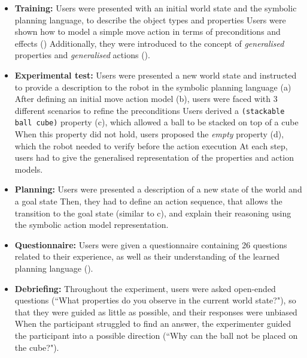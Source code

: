 \begin{itemize}
  \item{\textbf{Training:} Users were presented with an initial world state and the symbolic planning language, to describe the object types and properties
Users were shown how to model a simple move action in terms of preconditions and effects ()
Additionally, they were introduced to the concept of \textit{generalised} properties and \textit{generalised} actions ().}
  \item{\textbf{Experimental test:} Users were presented a new world state and instructed to provide a description to the robot in the symbolic planning language (a)
After defining an initial move action model (b), users were faced with 3 different scenarios to refine the preconditions
Users derived a \texttt{(stackable ball cube)} property (c), which allowed a ball to be stacked on top of a cube
When this property did not hold, users proposed the \textit{empty} property (d), which the robot needed to verify before the action execution
At each step, users had to give the generalised representation of the properties and action models.}
  \item{\textbf{Planning:} Users were presented a description of a new state of the world and a goal state
Then, they had to define an action sequence, that allows the transition to the goal state (similar to c), and explain their reasoning using the symbolic action model representation.}
  \item{\textbf{Questionnaire:} Users were given a questionnaire containing 26 questions related to their experience, as well as their understanding of the learned planning language ().}
   \item {\textbf{Debriefing:} Throughout the experiment, users were asked open-ended questions (``What properties do you observe in the current world state?"), so that they were guided as little as possible, and their responses were unbiased
When the participant struggled to find an answer, the experimenter guided the participant into a possible direction (``Why can the ball not be placed on the cube?").} 
\end{itemize}

